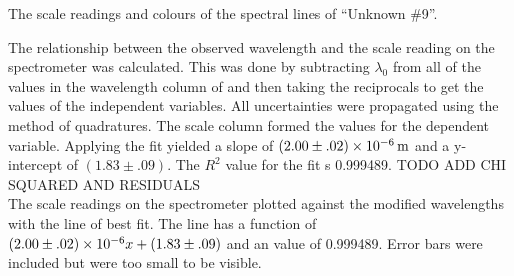 \begin{paper}
{The scale readings and colours of the spectral lines of ``Unknown \#9''.}


The relationship between the observed wavelength and the
scale reading on the spectrometer was calculated.
This was done by subtracting $\lambda_0$ from all of the values in the wavelength column of
\figHelium and then taking the reciprocals to get the values of the independent
variables.
All uncertainties were propagated using the method of quadratures.
The scale column formed the values for the dependent variable.
Applying the fit yielded a slope of $(2.00\pm.02)\times\SI{E-6}{\meter}$ and a
y-intercept of $(1.83\pm.09)$.
The $R^2$ value for the fit s 0.999489.
TODO ADD CHI SQUARED AND RESIDUALS\\

{The scale readings on the spectrometer plotted against the modified
wavelengths with the line of best fit.
The line has a function of $(2.00\pm.02)\times\SI{E-6}{}x+(1.83\pm.09)$ and an
 value of 0.999489.
Error bars were included but were too small to be visible.}


\end{paper}
